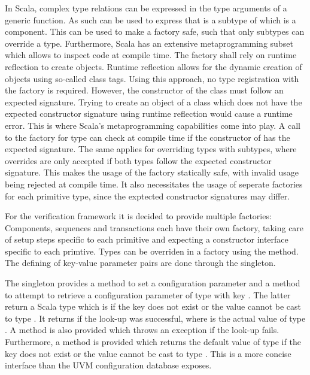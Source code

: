 In Scala, complex type relations can be expressed in the type arguments of a generic function. As such \ttt{[T <:
Component, R <: T]} can be used to express that  is a subtype of  which is a component. This can be
used to make a factory safe, such that only subtypes can override a type. Furthermore, Scala has an extensive metaprogramming subset which allows to inspect code at compile time. The factory shall rely on runtime reflection to create objects. Runtime reflection allows for the dynamic creation of objects using so-called class tags. Using this approach, no type registration with the factory is required. However, the constructor of the class must follow an expected signature. Trying to create an object of a class which does not have the expected constructor signature using runtime reflection would cause a runtime error. This is where Scala's metaprogramming capabilities come into play. A call to the factory for type  can check at compile time if the constructor of  has the expected signature. The same applies for overriding types with subtypes, where overrides are only accepted if both types follow the expected constructor signature. This makes the usage of the factory statically safe, with invalid usage being rejected at compile time. It also necessitates the usage of seperate factories for each primitive type, since the exptected constructor signatures may differ.

For the verification framework it is decided to provide multiple factories: Components, sequences and transactions each have their own factory, taking care of setup steps specific to each primitive and expecting a constructor interface specific to each primtive. Types can be overriden in a factory using the  method. The defining of key-value parameter pairs are done through the  singleton.

The  singleton provides a  method to set a configuration parameter and a  method to attempt to retrieve a configuration parameter of type  with key . The latter return a Scala  type which is  if the key does not exist or the value cannot be cast to type . It returns  if the look-up was successful, where  is the actual value of type . A method  is also provided which throws an exception if the look-up fails. Furthermore, a  method is provided which returns the default value of type  if the key does not exist or the value cannot be cast to type . This is a more concise interface than the UVM configuration database exposes.

